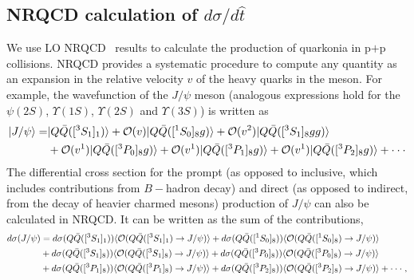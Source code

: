 \documentclass[article,showpacs,preprintnumbers,amsmath,amssymb]{revtex4}
\newcommand{\barQ}{{\bar{Q}}}
\newcommand{\hatt}{\hat{t}}
\newcommand{\calO}{{\cal{O}}}
\begin{document}
\subsection{NRQCD calculation of $d\sigma/d\hatt$~\label{section:Formalism}}
We use LO NRQCD~\cite{Bodwin:1994jh} results to calculate
the production of quarkonia in p$+$p collisions. NRQCD provides a systematic
procedure to compute any quantity as an expansion in the relative velocity $v$
of the heavy quarks in the meson. For example, the wavefunction of the $J/\psi$
meson (analogous expressions hold for the $\psi(2S)$, $\Upsilon(1S)$,
$\Upsilon(2S)$ and $\Upsilon(3S)$) is written as
\begin{equation}
\begin{split}
|J/\psi\rangle = &|Q\barQ([^3S_1]_{1})\rangle 
  + \calO(v)|Q\barQ([^1S_0]_{8}g)\rangle 
  + \calO(v^2)|Q\barQ([^3S_1]_{8}gg)\rangle\\
  &+ \calO(v^1)|Q\barQ([^3P_0]_{8}g)\rangle
  + \calO(v^1)|Q\barQ([^3P_1]_{8}g)\rangle
  + \calO(v^1)|Q\barQ([^3P_2]_{8}g)\rangle
  +\cdot\cdot\cdot
  \label{eq:Jfock}
\end{split}
\end{equation}
The differential cross section for the prompt (as opposed to inclusive, which
includes contributions from $B-$hadron decay) and direct (as opposed to
indirect, from the decay of heavier charmed mesons) production of $J/\psi$ can
also be calculated in NRQCD. It can be written as the sum of the contributions,
\begin{equation}
\begin{split}
d\sigma(J/\psi) &= d\sigma(Q\barQ([^3S_1]_{1}))
                  \langle \calO(Q\barQ([^3S_1]_{1})\rightarrow J/\psi)\rangle 
                +  d\sigma(Q\barQ([^1S_0]_{8}))
                  \langle \calO(Q\barQ([^1S_0]_{8})\rightarrow J/\psi)\rangle\\ 
                &+  d\sigma(Q\barQ([^3S_1]_{8}))
                  \langle \calO(Q\barQ([^3S_1]_{8})\rightarrow J/\psi)\rangle 
                +  d\sigma(Q\barQ([^3P_0]_{8}))
                  \langle \calO(Q\barQ([^3P_0]_{8})\rightarrow J/\psi)\rangle\\ 
                &+  d\sigma(Q\barQ([^3P_1]_{8}))
                  \langle \calO(Q\barQ([^3P_1]_{8})\rightarrow J/\psi)\rangle
                +  d\sigma(Q\barQ([^3P_2]_{8}))
                  \langle \calO(Q\barQ([^3P_2]_{8})\rightarrow J/\psi)\rangle
                + \cdot\cdot\cdot  \;,
\label{eq:dsigmaJ}
\end{split}
\end{equation}
\end{document}
